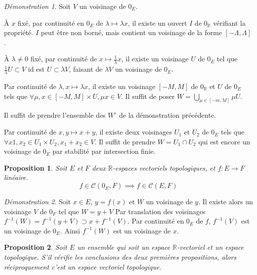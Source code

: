 \documentclass[a4paper, 11pt, french]{book}
\newenvironment{itemise}{\itemize}{\enditemize}
\theoremstyle{plain} %
\newtheorem{proposition}{Proposition}
\theoremstyle{definition} %
\theoremstyle{remark} %
\newtheorem*{demonstration}{Démonstration}
\newcommand{\1}{\mathds{1}}
\newcommand{\inv}[1]{#1^{-1}}
\newcommand{\R}{\mathbb{R}}
\renewcommand{\cal}[1]{\mathcal{#1}}
\begin{document}
\begin{demonstration}
	Soit $V$ un voisinage de $0_E$.
	\begin{itemise}
		\item À $x$ fixé, par continuité en $0_E$ de $\lambda\longmapsto\lambda x$, il existe un ouvert $I$ de $0_\R$ vérifiant la propriété.
		$I$ peut être non borné, mais contient un voisinage de la forme $[-\Lambda, \Lambda]$.
		\item À $\lambda\neq0$ fixé, par continuité de $x\longmapsto\frac{1}{\lambda}x$, il existe un voisinage $U$ de $0_E$ tel que $\frac{1}{\lambda}U\subset V$ id est $U\subset\lambda V$, faisant de $\lambda V$ un voisinage de $0_E$.
		\item Par continuité de $\lambda, x\longmapsto\lambda x$, il existe un voisinage $[-M, M]$ de $0_\R$ et $U$ de $0_E$ tels que $\forall\mu, x\in[-M, M]\times U, \mu x\in V$.
		Il suffit de poser $W=\bigcup_{\mu\in[-m, M]}\mu U$.
		\item Il suffit de prendre l'ensemble des $W^\circ$ de la démonstration précédente.
		\item Par continuité de $x, y\longmapsto x+y$, il existe deux voisinages $U_1$ et $U_2$ de $0_E$ tels que $\forall x1, x_2\in U_1\times U_2, x_1+x_2\in V$.
		Il suffit de prendre $W=U_1\cap U_2$ qui est encore un voisinage de $0_E$ par stabilité par intersection finie.
	\end{itemise}
\end{demonstration}

\begin{proposition}
	Soit $E$ et $F$ deux $\R$-espaces vectoriels topologiques, et $f:E\rightarrow F$ linéaire.
	$$
		f\in\cal{C}(0_E, F)\implies f\in\cal{C}(E, F)
	$$
\end{proposition}

\begin{demonstration}
	Soit $x\in E$, $y=f(x)$ et $W$ un voisinage de $y$.
	Il existe alors un voisinage $V$ de $0_F$ tel que $W=y+V$
	Par translation des voisinages $\inv{f}(W)=\inv{f}(y+V)\supset x+\inv{f}(V)$.
	Par continuité en $0_E$ de $f$, $\inv{f}(V)$ est un voisinage de $0_E$.
	Ainsi $\inv{f}(W)$ est un voisinage de $x$.
\end{demonstration}

\begin{proposition}
	Soit $E$ un ensemble qui soit un espace $\R$-vectoriel et un espace topologique.
	S'il vérifie les conclusions des deux premières propositions, alors réciproquement c'est un espace vectoriel topologique.
\end{proposition}
\end{document}
